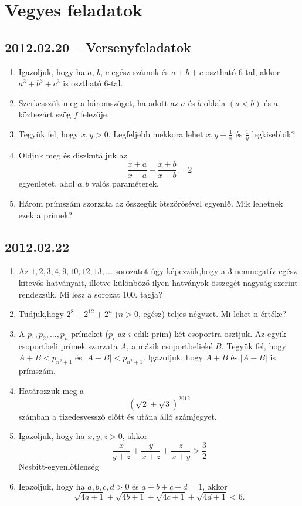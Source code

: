 \documentclass{article}
\begin{document}
\section*{Vegyes feladatok}

\subsection*{2012.02.20 -- Versenyfeladatok}
\begin{enumerate}
\item Igazoljuk, hogy ha $a$, $b$, $c$ egész számok és $a+b+c$ osztható 6-tal, akkor $a^3+b^3+c^3$ is osztható 6-tal.
\item Szerkesszük meg a háromszöget, ha adott az $a$ és $b$ oldala $(a<b)$ és a közbezárt szög $f$ felezője.
\item Tegyük fel, hogy $x,y>0$. Legfeljebb mekkora lehet $x,y+\frac{1}{x}$ és $\frac{1}{y}$ legkisebbik?
\item Oldjuk meg és diszkutáljuk az $$\frac{x+a}{x-a}+\frac{x+b}{x-b}=2$$ egyenletet, ahol $a,b$ valós paraméterek.
\item Három prímszám szorzata az összegük ötszörösével egyenlő. Mik lehetnek ezek a prímek?

\end{enumerate}

\subsection*{2012.02.22}
\begin{enumerate}
\item Az $1,2,3,4,9,10,12,13,...$ sorozatot úgy képezzük,hogy a $3$ nemnegatív egész kitevős hatványait, illetve különböző ilyen hatványok összegét nagyság szerint rendezzük. Mi lesz a sorozat 100. tagja?
\item Tudjuk,hogy $2^8+2^{12}+2^n$ ($n>0$, egész) teljes négyzet. Mi lehet n értéke?
\item A $p_1,p_2,...,p_n$ prímeket ($p_i$ az $i$-edik prím) két csoportra osztjuk. Az egyik csoportbeli prímek szorzata $A$, a másik csoportbelieké $B$. Tegyük fel, hogy $A+B< p_{n^2+1}$ és $|A-B| < p_{n^2+1}$. Igazoljuk, hogy $A+B$ és $|A-B|$ is prímszám. 
\item Határozzuk meg a $$(\sqrt{2}+\sqrt{3})^{2012}$$ számban a tizedesvessző előtt és utána álló számjegyet.
\item Igazoljuk, hogy ha $x,y,z>0$, akkor $$\frac{x}{y+z}+\frac{y}{x+z}+\frac{z}{x+y}>\frac{3}{2}$$ Nesbitt-egyenlőtlenség
\item Igazoljuk, hogy ha $a,b,c,d>0$ és $a+b+c+d=1$, akkor $$\sqrt{4a+1}+\sqrt{4b+1}+\sqrt{4c+1}+\sqrt{4d+1}<6.$$ 
\end{enumerate}
\end{document}
